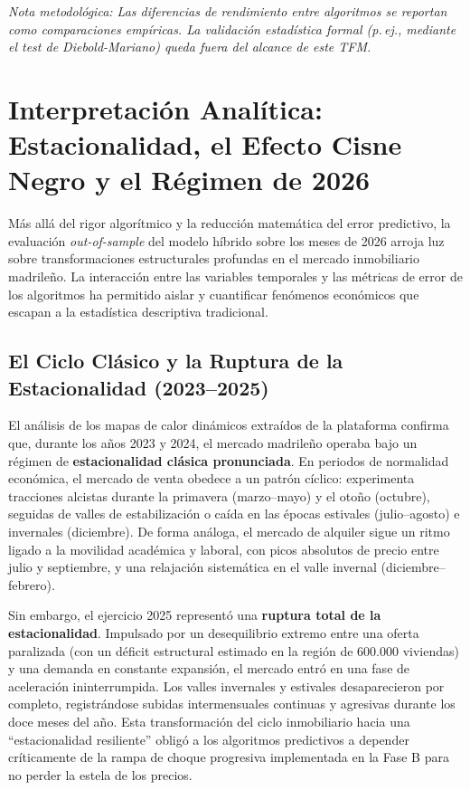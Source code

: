 \documentclass[a4paper,11pt,openany]{book}
\begin{document}
\noindent\textit{\small Nota metodológica: Las diferencias de rendimiento entre algoritmos se reportan como comparaciones empíricas. La validación estadística formal (p.\,ej., mediante el test de Diebold-Mariano) queda fuera del alcance de este TFM.}

\section{Interpretación Analítica: Estacionalidad, el Efecto Cisne Negro y el Régimen de 2026}
Más allá del rigor algorítmico y la reducción matemática del error predictivo, la evaluación \textit{out-of-sample} del modelo híbrido sobre los meses de 2026 arroja luz sobre transformaciones estructurales profundas en el mercado inmobiliario madrileño. La interacción entre las variables temporales y las métricas de error de los algoritmos ha permitido aislar y cuantificar fenómenos económicos que escapan a la estadística descriptiva tradicional.

\subsection{El Ciclo Clásico y la Ruptura de la Estacionalidad (2023--2025)}
El análisis de los mapas de calor dinámicos extraídos de la plataforma confirma que, durante los años 2023 y 2024, el mercado madrileño operaba bajo un régimen de \textbf{estacionalidad clásica pronunciada}. En periodos de normalidad económica, el mercado de venta obedece a un patrón cíclico: experimenta tracciones alcistas durante la primavera (marzo--mayo) y el otoño (octubre), seguidas de valles de estabilización o caída en las épocas estivales (julio--agosto) e invernales (diciembre). De forma análoga, el mercado de alquiler sigue un ritmo ligado a la movilidad académica y laboral, con picos absolutos de precio entre julio y septiembre, y una relajación sistemática en el valle invernal (diciembre--febrero).

Sin embargo, el ejercicio 2025 representó una \textbf{ruptura total de la estacionalidad}. Impulsado por un desequilibrio extremo entre una oferta paralizada (con un déficit estructural estimado en la región de 600.000 viviendas) y una demanda en constante expansión, el mercado entró en una fase de aceleración ininterrumpida. Los valles invernales y estivales desaparecieron por completo, registrándose subidas intermensuales continuas y agresivas durante los doce meses del año. Esta transformación del ciclo inmobiliario hacia una ``estacionalidad resiliente'' obligó a los algoritmos predictivos a depender críticamente de la rampa de choque progresiva implementada en la Fase B para no perder la estela de los precios.
\end{document}
